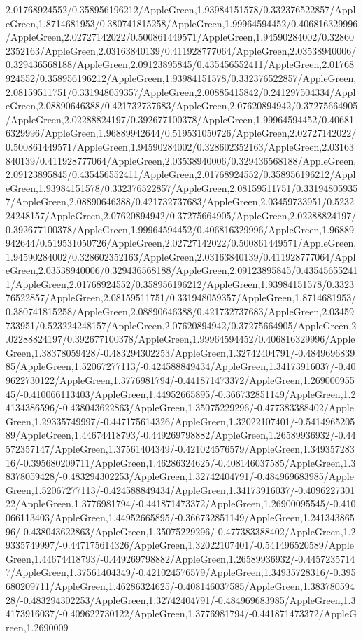{\begin{tikzternal}
{2.01768924552/0.358956196212/AppleGreen,1.93984151578/0.332376522857/AppleGreen,1.8714681953/0.380741815258/AppleGreen,1.99964594452/0.406816329996/AppleGreen,2.02727142022/0.500861449571/AppleGreen,1.94590284002/0.328602352163/AppleGreen,2.03163840139/0.411928777064/AppleGreen,2.03538940006/0.329436568188/AppleGreen,2.09123895845/0.435456552411/AppleGreen,2.01768924552/0.358956196212/AppleGreen,1.93984151578/0.332376522857/AppleGreen,2.08159511751/0.331948059357/AppleGreen,2.00885415842/0.241297504334/AppleGreen,2.08890646388/0.421732737683/AppleGreen,2.07620894942/0.37275664905/AppleGreen,2.02288824197/0.392677100378/AppleGreen,1.99964594452/0.406816329996/AppleGreen,1.96889942644/0.519531050726/AppleGreen,2.02727142022/0.500861449571/AppleGreen,1.94590284002/0.328602352163/AppleGreen,2.03163840139/0.411928777064/AppleGreen,2.03538940006/0.329436568188/AppleGreen,2.09123895845/0.435456552411/AppleGreen,2.01768924552/0.358956196212/AppleGreen,1.93984151578/0.332376522857/AppleGreen,2.08159511751/0.331948059357/AppleGreen,2.08890646388/0.421732737683/AppleGreen,2.03459733951/0.523224248157/AppleGreen,2.07620894942/0.37275664905/AppleGreen,2.02288824197/0.392677100378/AppleGreen,1.99964594452/0.406816329996/AppleGreen,1.96889942644/0.519531050726/AppleGreen,2.02727142022/0.500861449571/AppleGreen,1.94590284002/0.328602352163/AppleGreen,2.03163840139/0.411928777064/AppleGreen,2.03538940006/0.329436568188/AppleGreen,2.09123895845/0.435456552411/AppleGreen,2.01768924552/0.358956196212/AppleGreen,1.93984151578/0.332376522857/AppleGreen,2.08159511751/0.331948059357/AppleGreen,1.8714681953/0.380741815258/AppleGreen,2.08890646388/0.421732737683/AppleGreen,2.03459733951/0.523224248157/AppleGreen,2.07620894942/0.37275664905/AppleGreen,2.02288824197/0.392677100378/AppleGreen,1.99964594452/0.406816329996/AppleGreen,1.38378059428/-0.483294302253/AppleGreen,1.32742404791/-0.484969683985/AppleGreen,1.52067277113/-0.424588849434/AppleGreen,1.34173916037/-0.409622730122/AppleGreen,1.3776981794/-0.441871473372/AppleGreen,1.26900095545/-0.410066113403/AppleGreen,1.44952665895/-0.366732851149/AppleGreen,1.24134386596/-0.438043622863/AppleGreen,1.35075229296/-0.477383388402/AppleGreen,1.29335749997/-0.447175614326/AppleGreen,1.32022107401/-0.541496520589/AppleGreen,1.44674418793/-0.449269798882/AppleGreen,1.26589936932/-0.44572357147/AppleGreen,1.37561404349/-0.421024576579/AppleGreen,1.34935728316/-0.395680209711/AppleGreen,1.46286324625/-0.408146037585/AppleGreen,1.38378059428/-0.483294302253/AppleGreen,1.32742404791/-0.484969683985/AppleGreen,1.52067277113/-0.424588849434/AppleGreen,1.34173916037/-0.409622730122/AppleGreen,1.3776981794/-0.441871473372/AppleGreen,1.26900095545/-0.410066113403/AppleGreen,1.44952665895/-0.366732851149/AppleGreen,1.24134386596/-0.438043622863/AppleGreen,1.35075229296/-0.477383388402/AppleGreen,1.29335749997/-0.447175614326/AppleGreen,1.32022107401/-0.541496520589/AppleGreen,1.44674418793/-0.449269798882/AppleGreen,1.26589936932/-0.44572357147/AppleGreen,1.37561404349/-0.421024576579/AppleGreen,1.34935728316/-0.395680209711/AppleGreen,1.46286324625/-0.408146037585/AppleGreen,1.38378059428/-0.483294302253/AppleGreen,1.32742404791/-0.484969683985/AppleGreen,1.34173916037/-0.409622730122/AppleGreen,1.3776981794/-0.441871473372/AppleGreen,1.2690009}
\end{tikzternal}}
